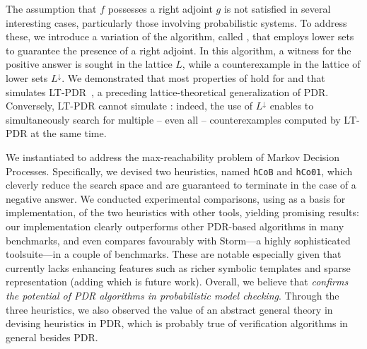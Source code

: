 The assumption that $f$ possesses a right adjoint $g$ is not satisfied in several interesting cases, particularly those involving probabilistic systems. To address these, we introduce a variation of the algorithm, called \ADPDR{}, that employs lower sets to guarantee the presence of a right adjoint. In this algorithm, a witness for the positive answer is sought in the lattice $L$, while a counterexample in the lattice of lower sets $L^\downarrow$. We demonstrated that most properties of \APDR{} hold for \ADPDR{} and that \ADPDR{} simulates LT-PDR~\cite{KUKSH22}, a preceding lattice-theoretical generalization of PDR. Conversely, LT-PDR cannot simulate \ADPDR{}: indeed, the use of $L^\downarrow$ enables \ADPDR{} to simultaneously search for multiple -- even all -- counterexamples computed by LT-PDR at the same time.

We instantiated \ADPDR{} to address the max-reachability problem of Markov Decision Processes. Specifically, we devised two heuristics, named \verb|hCoB| and \verb|hCo01|, which cleverly reduce the search space and are guaranteed to terminate in the case of a negative answer. We conducted experimental comparisons, using \APDRAI{} as a basis for implementation, of the two heuristics with other tools, yielding promising results: our implementation clearly outperforms other PDR-based algorithms in many benchmarks, and even compares favourably with Storm---a highly sophisticated toolsuite---in a couple of benchmarks. These are notable especially given that \ADPDR{} currently lacks enhancing features such as richer symbolic templates and sparse representation (adding which is future work). Overall, we believe that \ADPDR{} \emph{confirms the potential of PDR algorithms in probabilistic model checking}. Through the three heuristics, we also observed the value of an abstract general theory in devising heuristics in PDR, which is probably true of verification algorithms in general besides PDR.
